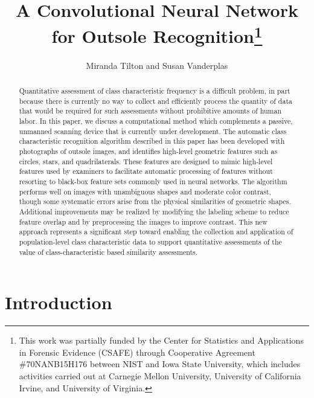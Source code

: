 \documentclass{article}\usepackage[]{graphicx}\usepackage[table]{xcolor}
\title{A Convolutional Neural Network for Outsole Recognition\footnote{This work was partially funded by the Center for Statistics and Applications in Forensic Evidence (CSAFE) through Cooperative Agreement \#70NANB15H176 between NIST and Iowa State University, which includes activities carried out at Carnegie Mellon University, University of California Irvine, and University of Virginia.}}
\author{Miranda Tilton and Susan Vanderplas}
\newcommand{\mt}[1]{{\color{magenta} #1}}
\begin{document}
\maketitle
\begin{abstract}
Quantitative assessment of class characteristic frequency is a difficult problem, in part because there is currently no way to collect and efficiently process the quantity of data that would be required for such assessments without prohibitive amounts of human labor. In this paper, we discuss a computational method which complements a passive, unmanned scanning device that is currently under development. The automatic class characteristic recognition algorithm described in this paper has been developed with photographs of outsole images, and identifies high-level geometric features such as circles, stars, and quadrilaterals. These features are designed to mimic high-level features used by examiners to facilitate automatic processing of features without resorting to black-box feature sets commonly used in neural networks. The algorithm performs well on images with unambiguous shapes and moderate color contrast, though some systematic errors arise from the physical similarities of geometric shapes. Additional improvements may be realized by modifying the labeling scheme to reduce feature overlap and by preprocessing the images to improve contrast. This new approach represents a significant step toward enabling the collection and application of population-level class characteristic data to support quantitative assessments of the value of class-characteristic based similarity assessments.
\end{abstract}
%


\linenumbers

\section{Introduction}\label{sec:Introduction}
\end{document}
